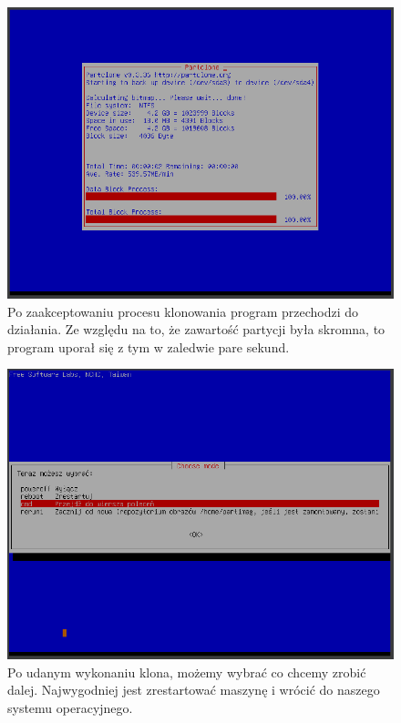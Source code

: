\documentclass[0.82pt,a4paper]{article}
\begin{document}
    \begin{figure}[H]
        \centering
        \includegraphics[width=0.8\linewidth]{media/Clonezilla/clone11.PNG}
        \caption[clone koniec]{Po zaakceptowaniu procesu klonowania program przechodzi do działania. Ze względu na to, że zawartość partycji była skromna, to program uporał się z tym w zaledwie pare sekund.}
        \label{fig:clone11}
    \end{figure}
    
    \begin{figure}[H]
        \centering
        \includegraphics[width=0.8\linewidth]{media/Clonezilla/clone12.PNG}
        \caption[clone restart]{Po udanym wykonaniu klona, możemy wybrać co chcemy zrobić dalej. Najwygodniej jest zrestartować maszynę i wrócić do naszego systemu operacyjnego.}
        \label{fig:clone12}
    \end{figure}
    
\end{document}
